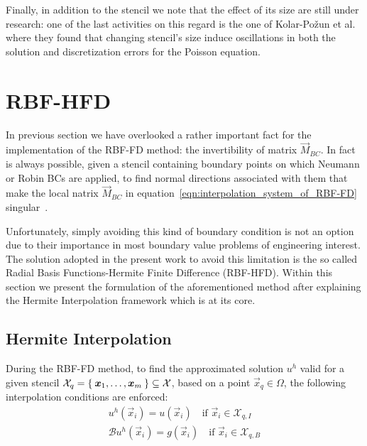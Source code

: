 \bigskip
Finally, in addition to the stencil we note that the effect of its size are still under research: one of the last activities on this regard is the one of Kolar-Požun et al.~\cite{Kolar-Požun:effect_of_stencil_size} where they found that changing stencil's size induce oscillations in both the solution and discretization errors for the Poisson equation.




\section{RBF-HFD}

In previous section we have overlooked a rather important fact for the implementation of the RBF-FD method: the invertibility of matrix $\vec{M}_{BC}$. In fact is always possible, given a stencil containing boundary points on which Neumann or Robin BCs are applied, to find normal directions associated with them that make the local natrix $\vec{M}_{BC}$ in equation~\eqref{eqn:interpolation_system_of_RBF-FD} singular~\cite{Miotti:phd_thesis}.

Unfortunately, simply avoiding this kind of boundary condition is not an option due to their importance in most boundary value problems of engineering interest.
The solution adopted in the present work to avoid this limitation is the so called Radial Basis Functions-Hermite Finite Difference (RBF-HFD).
Within this section we present the formulation of the aforementioned method after explaining the Hermite Interpolation framework which is at its core.


\subsection{Hermite Interpolation}

During the RBF-FD method, to find the approximated solution $u^h$ valid for a given stencil $\mathcal{X}_q = \Set{\boldsymbol{x}_1, \dots, \boldsymbol{x}_m} \subseteq \mathcal{X}$, based on a point $\vec{x}_q \in \Omega$, the following interpolation conditions are enforced:
\begin{subequations}
	\label{eqn:interpolation_conditions_on_PDE_Hermite_Interpolation_subsection}
	\begin{gather}
		u^h(\vec{x}_i) = u(\vec{x}_i) \quad \text{if $\vec{x}_i \in \mathcal{X}_{q,I}$}  \label{eqn:u^h_approx_u_conditions_RBF-HFD_section} \\
		\mathcal{B} u^h(\vec{x}_i) = g(\vec{x}_i) \quad \text{if $\vec{x}_i \in \mathcal{X}_{q,B}$} \label{eqn:u^h_approx_conditions_on_boundary_RBF-HFD_section}
	\end{gather}
\end{subequations}

